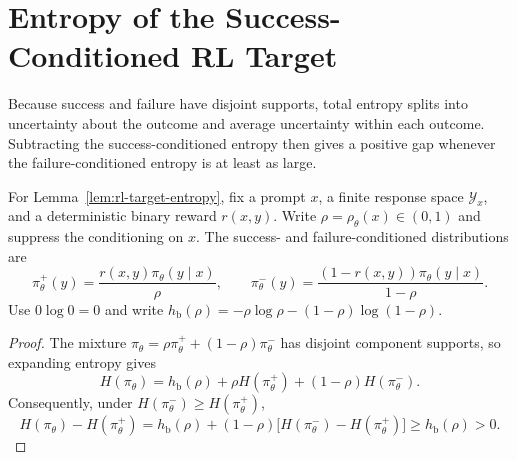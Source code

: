 \section{Entropy of the Success-Conditioned RL Target}
\label{app:rl-target-entropy}

\begin{insight}
Because success and failure have disjoint supports, total entropy splits
into uncertainty about the outcome and average uncertainty within each outcome.
Subtracting the success-conditioned entropy then gives a positive gap
whenever the failure-conditioned entropy is at least as large.
\end{insight}

For Lemma~\ref{lem:rl-target-entropy}, fix a prompt $x$, a finite response
space $\mathcal Y_x$, and a deterministic binary reward $r(x,y)$.
Write $\rho=\rho_\theta(x)\in(0,1)$ and suppress the conditioning on $x$.
The success- and failure-conditioned distributions are
\begin{equation}
 \pi_\theta^+(y)=\frac{r(x,y)\pi_\theta(y\mid x)}{\rho},
 \qquad
 \pi_\theta^-(y)=\frac{(1-r(x,y))\pi_\theta(y\mid x)}{1-\rho}.
 \label{eq:rl-success-failure-distributions}
\end{equation}
Use $0\log0=0$ and write
$h_{\mathrm b}(\rho)=-\rho\log\rho-(1-\rho)\log(1-\rho)$.

\begin{proof}
The mixture $\pi_\theta=\rho\pi_\theta^++(1-\rho)\pi_\theta^-$
has disjoint component supports, so expanding entropy gives
\begin{equation}
 H(\pi_\theta)=h_{\mathrm b}(\rho)
    +\rho H(\pi_\theta^+)+(1-\rho)H(\pi_\theta^-).
 \label{eq:rl-entropy-decomposition}
\end{equation}
Consequently, under $H(\pi_\theta^-)\ge H(\pi_\theta^+)$,
\begin{equation}
 H(\pi_\theta)-H(\pi_\theta^+)
 =h_{\mathrm b}(\rho)+(1-\rho)
    \bigl[H(\pi_\theta^-)-H(\pi_\theta^+)\bigr]
 \ge h_{\mathrm b}(\rho)>0.
 \label{eq:rl-target-entropy-gap}
\end{equation}
\end{proof}
